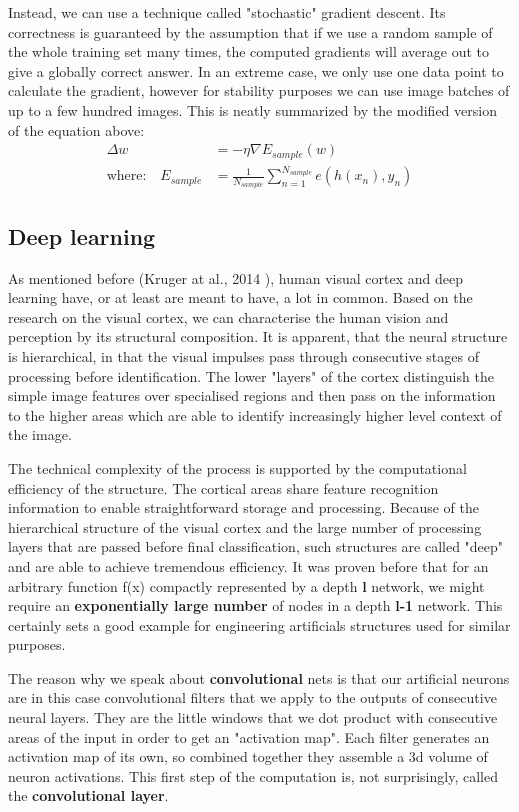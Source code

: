 \documentclass[a4paper, 11pt]{article}
\numberwithin{equation}{section}
\begin{document}
	Instead, we can use a technique called "stochastic" gradient descent. Its correctness is guaranteed by the assumption that if we use a random sample of the whole training set many times, the computed gradients will average out to give a globally correct answer. In an extreme case, we only use one data point to calculate the gradient, however for stability purposes we can use image batches of up to a few hundred images. This is neatly summarized by the modified version of the equation above:
	\begin{align}
	\Delta w &= - \eta \nabla E_{sample}(w) \\
	\textrm{where:} \quad E_{sample} &= \frac{1}{N_{sample}} \sum_{n = 1}^{N_{sample}} e(h(x_n), y_n)
	\end{align}
	
	\subsection{Deep learning}
	
	As mentioned before (Kruger at al., 2014 \cite{kruger2013deep}), human visual cortex and deep learning have, or at least are meant to have, a lot in common. Based on the research on the visual cortex, we can characterise the human vision and perception by its structural composition. It is apparent, that the neural structure is hierarchical, in that the visual impulses pass through consecutive stages of processing before identification. The lower "layers" of the cortex distinguish the simple image features over specialised regions and then pass on the information to the higher areas which are able to identify increasingly higher level context of the image.
	
	The technical complexity of the process is supported by the computational efficiency of the structure. The cortical areas share feature recognition information to enable straightforward storage and processing. Because of the hierarchical structure of the visual cortex and the large number of processing layers that are passed before final classification, such structures are called "deep" and are able to achieve tremendous efficiency. It was proven before that for an arbitrary function f(x) compactly represented by a depth \textbf{l} network, we might require an \textbf{exponentially large number} of nodes in a depth \textbf{l-1} network. This certainly sets a good example for engineering artificials structures used for similar purposes.
	
	The reason why we speak about \textbf{convolutional} nets \cite{stanford2016convnets} is that our artificial neurons are in this case convolutional filters that we apply to the outputs of consecutive neural layers. They are the little windows that we dot product with consecutive areas of the input in order to get an "activation map". Each filter generates an activation map of its own, so combined together they assemble a 3d volume of neuron activations. This first step of the computation is, not surprisingly, called the \textbf{convolutional layer}.
	
\end{document}
